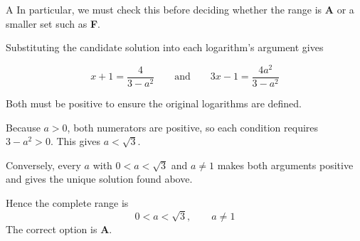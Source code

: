 \documentclass[11pt,a4paper]{article}
\begin{document}
\begin{enumerate}[label=\textbf{\arabic*.},leftmargin=*,itemsep=0pt,start=4]
\begin{djsSolution}{A}
In particular, we must check this before deciding whether the range is \textbf{A} or a smaller set such as \textbf{F}.

Substituting the candidate solution into each logarithm's argument gives

\[x+1=\frac{4}{3-a^2}\qquad\text{and}\qquad 3x-1=\frac{4a^2}{3-a^2}\]

Both must be positive to ensure the original logarithms are defined. 

Because $a>0$, both numerators are positive, so each condition requires $3-a^2>0$. This gives $a<\sqrt3$. 

Conversely, every $a$ with $0<a<\sqrt3$ and $a\ne1$ makes both arguments positive and gives the unique solution found above. 

Hence the complete range is
\[0<a<\sqrt3,\qquad a\ne1\]
The correct option is \textbf{A}.
\end{djsSolution}
\end{enumerate}
\clearpage
\thispagestyle{djssolutions}
\vspace*{8pt}
\end{document}
